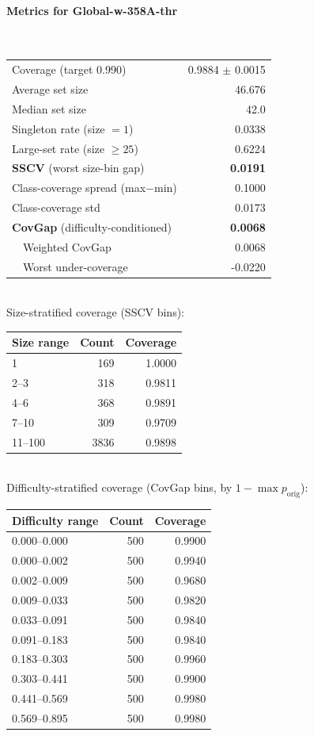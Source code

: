 \documentclass[parskip=half]{scrartcl}
\begin{document}
\paragraph{Metrics for Global-w-358A-thr}~\\
\begin{tabular}{l r}
\hline
Coverage (target 0.990) & 0.9884 $\pm$ 0.0015 \\
Average set size & 46.676 \\
Median set size & 42.0 \\
Singleton rate (size $=1$) & 0.0338 \\
Large-set rate (size $\geq 25$) & 0.6224 \\
\textbf{SSCV} (worst size-bin gap) & \textbf{0.0191} \\
Class-coverage spread (max$-$min) & 0.1000 \\
Class-coverage std & 0.0173 \\
\textbf{CovGap} (difficulty-conditioned) & \textbf{0.0068} \\
~~Weighted CovGap & 0.0068 \\
~~Worst under-coverage & -0.0220 \\
\hline
\end{tabular}\\[0.5em]
\textsf{\scriptsize Size-stratified coverage (SSCV bins):}\\
\begin{tabular}{l r r}
\hline
Size range & Count & Coverage \\
\hline
1 & 169 & 1.0000 \\
2--3 & 318 & 0.9811 \\
4--6 & 368 & 0.9891 \\
7--10 & 309 & 0.9709 \\
11--100 & 3836 & 0.9898 \\
\hline
\end{tabular}\\[0.5em]
\textsf{\scriptsize Difficulty-stratified coverage (CovGap bins, by $1-\max p_{\mathrm{orig}}$):}\\
\begin{tabular}{l r r}
\hline
Difficulty range & Count & Coverage \\
\hline
0.000--0.000 & 500 & 0.9900 \\
0.000--0.002 & 500 & 0.9940 \\
0.002--0.009 & 500 & 0.9680 \\
0.009--0.033 & 500 & 0.9820 \\
0.033--0.091 & 500 & 0.9840 \\
0.091--0.183 & 500 & 0.9840 \\
0.183--0.303 & 500 & 0.9960 \\
0.303--0.441 & 500 & 0.9900 \\
0.441--0.569 & 500 & 0.9980 \\
0.569--0.895 & 500 & 0.9980 \\
\hline
\end{tabular}\\[0.5em]
\end{document}
